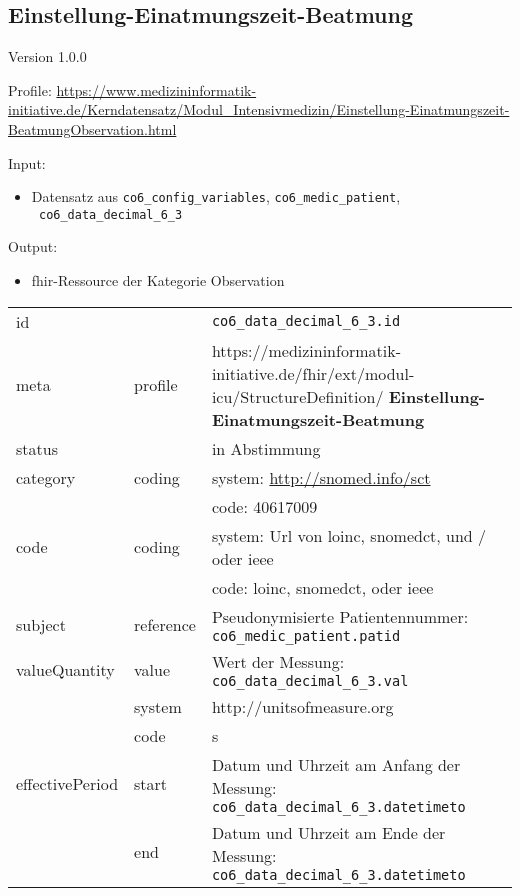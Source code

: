 \subsection{Einstellung-Einatmungszeit-Beatmung} 
\noindent Version 1.0.0

\noindent Profile: \url{https://www.medizininformatik-initiative.de/Kerndatensatz/Modul_Intensivmedizin/Einstellung-Einatmungszeit-BeatmungObservation.html}

\noindent Input:
\begin{itemize}
	\item Datensatz aus \texttt{co6\_config\_variables}, \texttt{co6\_medic\_patient}, \\ \texttt{
co6\_data\_decimal\_6\_3}
\end{itemize}
Output:
\begin{itemize}
        \item \ac{fhir}-Ressource der Kategorie \glqq Observation\grqq{}
\end{itemize}
\begin{longtable}{|l|l|p{7.5cm}|}
        \hline
        \rowcolor{lightgray} \multicolumn{3}{|l|}{Data Mapping (inhaltlich)} \\ \hline
        id &  & \texttt{co6\_data\_decimal\_6\_3.id} \\ \hline
	meta & profile & https://medizininformatik-initiative.de/fhir/ext/modul-icu/StructureDefinition/\textbf{
Einstellung-Einatmungszeit-Beatmung} \\ \hline 
	status &  & in Abstimmung  \\ \hline 
	category & coding & system: \url{http://snomed.info/sct} \\
\cline{3-3}
	& & code: 40617009\\ \hline
	code & coding & system: Url von \ac{loinc}, \ac{snomedct}, und / oder \ac{ieee} \\ 
	\cline{3-3} 
	 &  & code: \ac{loinc}, \ac{snomedct}, oder \ac{ieee} \\ \hline
	subject & reference & Pseudonymisierte Patientennummer: \texttt{co6\_medic\_patient.patid} \\ \hline
	valueQuantity & value & Wert der Messung: \texttt{
co6\_data\_decimal\_6\_3.val} \\
        \cline{2-3}
         & system & http://unitsofmeasure.org \\
         \cline{2-3}
         & code &
s
\\ \hline
    effectivePeriod & start & Datum und Uhrzeit am Anfang der Messung: \texttt{
co6\_data\_decimal\_6\_3.datetimeto} \\
    \cline{2-3}
     & end & Datum und Uhrzeit am Ende der Messung: \texttt{
co6\_data\_decimal\_6\_3.datetimeto} \\ \hline
\end{longtable}

